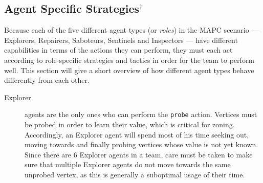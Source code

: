 \subsection[Agent Specific Strategies]{Agent Specific Strategies$^\dagger$}\label{alg:agentstrategies}
Because each of the five different agent types (or \emph{roles}) in the MAPC scenario --- Explorers, Repairers, Saboteurs, Sentinels and Inspectors --- have different capabilities in terms of the actions they can perform, they must each act according to role-specific strategies and tactics in order for the team to perform well.
This section will give a short overview of how different agent types behave differently from each other.
\begin{description}
    \item[Explorer] agents are the only ones who can perform the \texttt{probe} action.
        Vertices must be probed in order to learn their value, which is critical for zoning.
        Accordingly, an Explorer agent will spend most of his time seeking out, moving towards and finally probing vertices whose value is not yet known.
        Since there are 6 Explorer agents in a team, care must be taken to make sure that multiple Explorer agents do not move towards the same unprobed vertex, as this is generally a suboptimal usage of their time.


\end{description}
